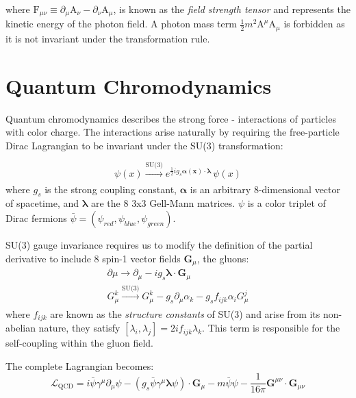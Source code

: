 where $\mathrm{F}_{\mu\nu}\equiv\partial_{\mu}\mathrm{A}_{\nu} - \partial_{\nu}\mathrm{A}_{\mu}$, is known as the \textit{field strength tensor} and represents the kinetic energy of the photon field. A photon mass term $\frac{1}{2}m^{2}\mathrm{A}^{\mu}\mathrm{A}_{\mu}$ is forbidden as it is not invariant under the transformation rule.

\section{Quantum Chromodynamics} 

Quantum chromodynamics describes the strong force - interactions of particles with color charge. The interactions arise naturally by requiring the free-particle Dirac Lagrangian to be invariant under the SU(3) transformation:

\begin{equation}
\psi(x) \xrightarrow[]{\text{SU(3)}} e^{\frac{1}{2}ig_{s}\bm{\alpha(x)}\cdot\bm{\lambda}}\,\psi(x)
\end{equation}
where $g_{s}$ is the strong coupling constant, $\bm{\alpha}$ is an arbitrary 8-dimensional vector of spacetime, and $\bm{\lambda}$ are the 8 3x3 Gell-Mann matrices. $\psi$ is a color triplet of Dirac fermions $\bar{\psi} = (\psi_{red}, \psi_{blue}, \psi_{green})$.

SU(3) gauge invariance requires us to modify the definition of the partial derivative to include 8 spin-1 vector fields $\bm{G}_{\mu}$, the gluons:
\begin{equation}
\begin{array}{l}
\partial{\mu} \rightarrow \partial_{\mu} - i g_{s} \bm{\lambda} \cdot \bm{G}_{\mu}\\
G^{k}_{\mu} \xrightarrow[]{\text{SU(3)}} G^{k}_{\mu} - g_{s}\partial_{\mu}\alpha_{k} - g_{s}f_{ijk}\alpha_{i}G^{j}_{\mu}
\end{array}
\end{equation}
where $f_{ijk}$ are known as the \textit{structure constants} of SU(3) and arise from its non-abelian nature, they satisfy $[\lambda_{i},\lambda_{j}] = 2if_{ijk}\lambda_{k}$. This term is responsible for the self-coupling within the gluon field.

The complete Lagrangian becomes:
\begin{equation}
\mathcal{L}_{\mathrm{QCD}} =
i \bar{\psi} \gamma^{\mu} \partial_{\mu} \psi
- (g_{s} \bar{\psi} \gamma^{\mu} \bm{\lambda} \psi) \cdot \textbf{G}_{\mu}
- m \bar{\psi} \psi
- \frac{1}{16\pi} \textbf{G}^{\mu\nu} \cdot \textbf{G}_{\mu\nu}
\end{equation}

